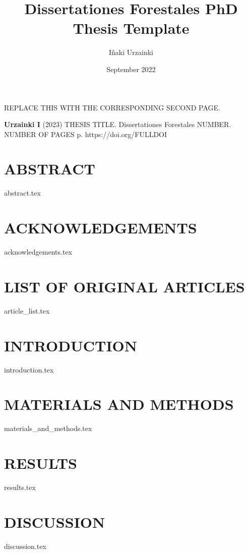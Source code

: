 \documentclass[b5paper, twoside, 10pt]{article}
\title{Dissertationes Forestales PhD Thesis Template}
\author{Iñaki Urzainki}
\date{September 2022}
\begin{document}
\maketitle
\newpage

REPLACE THIS WITH THE CORRESPONDING SECOND PAGE.
\newpage

\noindent \textbf{Urzainki I} (2023) THESIS TITLE. Dissertationes Forestales NUMBER. NUMBER OF PAGES p.
https://doi.org/FULLDOI
\section*{ABSTRACT}
{abstract.tex} 
\newpage

\section*{ACKNOWLEDGEMENTS}
{acknowledgements.tex} 
\newpage

\section*{LIST OF ORIGINAL ARTICLES}
{article_list.tex} 
\newpage

\tableofcontents
\newpage


\section{INTRODUCTION}
{introduction.tex} %

\section{MATERIALS AND METHODS}
{materials_and_methods.tex}


\section{RESULTS}
{results.tex}

\section{DISCUSSION}
{discussion.tex}
\newpage

\newrefcontext[sorting=nyt] %
\printbibliography[title = {REFERENCES}]
\end{document}
